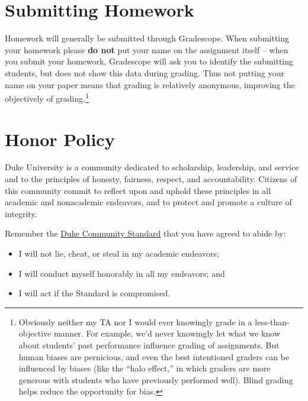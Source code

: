 \documentclass[12pt]{article}
\begin{document}


\section{Submitting Homework}

Homework will generally be submitted through Gradescope. When submitting your homework please {\color{red}\textbf{do not}} put your name on the assignment itself -- when you submit your homework, Gradescope will ask you to identify the submitting students, but does not show this data during grading. Thus not putting your name on your paper means that grading is relatively anonymous, improving the objectively of grading.\footnote{Obviously neither my TA nor I would ever knowingly grade in a less-than-objective manner. For example, we'd never knowingly let what we know about students' past performance influence grading of assignments. But human biases are pernicious, and even the best intentioned graders can be influenced by biases (like the ``halo effect,'' in which graders are more generous with students who have previously performed well). Blind grading helps reduce the opportunity for bias.}


\section{Honor Policy}

Duke University is a community dedicated to scholarship, leadership, and service and to the principles of honesty, fairness, respect, and accountability. Citizens of this community commit to reflect upon and uphold these principles in all academic and nonacademic endeavors, and to protect and promote a culture of integrity.

Remember the \href{https://studentaffairs.duke.edu/conduct/about-us/duke-community-standard}{Duke Community Standard} that you have agreed to abide by:

\begin{itemize}
	\item I will not lie, cheat, or steal in my academic endeavors;
	\item I will conduct myself honorably in all my endeavors; and
	\item I will act if the Standard is compromised.
\end{itemize}
\end{document}

